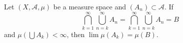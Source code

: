 Let $(X, \mathcal{A}, \mu)$ be a measure space and $(A_n) \subset \mathcal{A}$. If
$$\bigcap_{k=1}^{\infty}\bigcup_{n=k}^{\infty} A_n = \bigcap_{k=1}^{\infty}\bigcup_{n=k}^{\infty} A_n = B$$
and $\mu(\bigcup A_k) < \infty$, then $\lim \mu(A_k) = \mu(B)$.